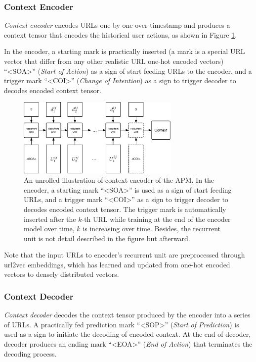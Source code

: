 \subsubsection{Context Encoder}

\emph{Context encoder} encodes URLs one by one over timestamp and produces a context tensor 
that encodes the historical user actions, as shown in Figure \ref{fig:encoder}. 

In the encoder, a starting mark is practically inserted (a mark is a special URL vector that 
differ from any other realistic URL one-hot encoded vectors) ``<SOA>'' (\emph{Start of Action})
as a sign of start feeding URLs to the encoder, and a trigger mark ``<COI>'' (\emph{Change of Intention}) as
a sign to trigger decoder to decodes encoded context tensor.

\begin{figure}
    \centering
    \includegraphics[width=0.7\textwidth]{figures/encoder}
    \caption{An unrolled illustration of context encoder of the APM. 
    In the encoder, a starting mark ``<SOA>'' is used as a sign of start feeding URLs, 
    and a trigger mark ``<COI>'' as a sign to trigger decoder to decodes 
    encoded context tensor. The trigger mark is automatically inserted after the $k$-th URL 
    while training at the end of the encoder model over time, $k$ is increasing over time. 
    Besides, the recurrent unit is not detail described in the figure but afterward.}
    \label{fig:encoder}
\end{figure}

Note that the input URLs to encoder's recurrent unit are preprocessed through 
url2vec embeddings, which has learned and updated from one-hot encoded vectors to 
densely distributed vectors.

\subsubsection{Context Decoder}

\emph{Context decoder} decodes the context tensor produced by the encoder into a series of URLs. 
A practically fed prediction mark ``<SOP>'' (\emph{Start of Prediction}) is used
as a sign to initiate the decoding of encoded context. 
At the end of decoder, decoder produces an ending mark ``<EOA>'' (\emph{End of Action}) 
that terminates the decoding process.

